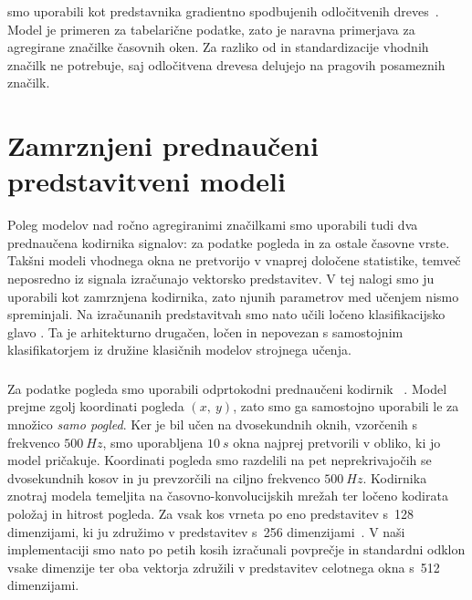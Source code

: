 \subsubsection*{}

 smo uporabili kot predstavnika gradientno spodbujenih odločitvenih dreves~\cite{ke2017lightgbm}.
Model je primeren za tabelarične podatke, zato je naravna primerjava za agregirane značilke časovnih oken.
Za razliko od  in  standardizacije vhodnih značilk ne potrebuje, saj odločitvena drevesa delujejo na pragovih posameznih značilk.

\section{Zamrznjeni prednaučeni predstavitveni modeli}
\label{subsec:zamrznjeni-prednauceni-modeli}

\enlargethispage{2\baselineskip}
Poleg modelov nad ročno agregiranimi značilkami smo uporabili tudi dva prednaučena kodirnika signalov:  za podatke pogleda in  za ostale časovne vrste.
Takšni modeli vhodnega okna ne pretvorijo v vnaprej določene statistike, temveč neposredno iz signala izračunajo vektorsko predstavitev.
V tej nalogi smo ju uporabili kot zamrznjena kodirnika, zato njunih parametrov med učenjem nismo spreminjali.
Na izračunanih predstavitvah smo nato učili ločeno klasifikacijsko glavo .
Ta  je arhitekturno drugačen, ločen in nepovezan s samostojnim klasifikatorjem  iz družine klasičnih modelov strojnega učenja.

\subsubsection*{}
\label{subsec:gazemae-model}

Za podatke pogleda smo uporabili odprtokodni prednaučeni kodirnik ~\cite{bautista2021gazemae}.
Model prejme zgolj koordinati pogleda $(x,~y)$, zato smo ga samostojno uporabili le za množico \emph{samo pogled}.
Ker je bil  učen na dvosekundnih oknih, vzorčenih s frekvenco $500~Hz$, smo uporabljena $10~s$ okna najprej pretvorili v obliko, ki jo model pričakuje.
Koordinati pogleda smo razdelili na pet neprekrivajočih se dvosekundnih kosov in ju prevzorčili na ciljno frekvenco $500~Hz$.
Kodirnika znotraj modela temeljita na časovno-konvolucijskih mrežah ter ločeno kodirata položaj in hitrost pogleda.
Za vsak kos vrneta po eno predstavitev s~128 dimenzijami, ki ju združimo v predstavitev s~256 dimenzijami~\cite{bautista2021gazemae}.
V naši implementaciji smo nato po petih kosih izračunali povprečje in standardni odklon vsake dimenzije ter oba vektorja združili v predstavitev celotnega okna s~512 dimenzijami.

